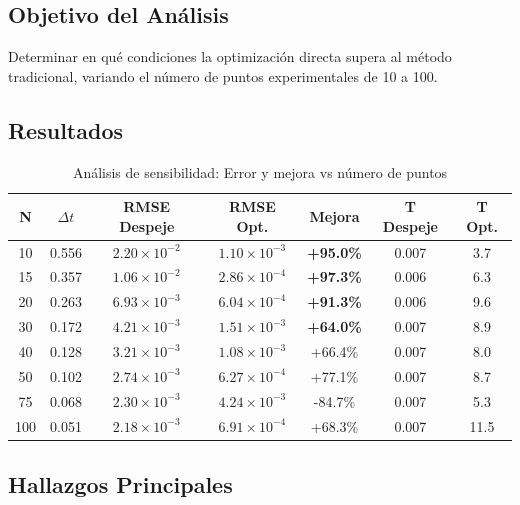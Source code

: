 \documentclass[11pt,a4paper]{article}
\begin{document}
\subsection{Objetivo del Análisis}

Determinar en qué condiciones la optimización directa supera al método tradicional, variando el número de puntos experimentales de 10 a 100.

\subsection{Resultados}

\begin{table}[H]
\centering
\caption{Análisis de sensibilidad: Error y mejora vs número de puntos}
\label{tab:sensitivity}
\small
\begin{tabular}{@{}ccccccc@{}}
\toprule
\textbf{N} & \textbf{$\Delta t$} & \textbf{RMSE Despeje} & \textbf{RMSE Opt.} & \textbf{Mejora} & \textbf{T Despeje} & \textbf{T Opt.} \\
\midrule
\rowcolor{green!20}
10  & 0.556 & $2.20 \times 10^{-2}$ & $1.10 \times 10^{-3}$ & \textbf{+95.0\%} & 0.007 & 3.7 \\
\rowcolor{green!20}
15  & 0.357 & $1.06 \times 10^{-2}$ & $2.86 \times 10^{-4}$ & \textbf{+97.3\%} & 0.006 & 6.3 \\
\rowcolor{green!15}
20  & 0.263 & $6.93 \times 10^{-3}$ & $6.04 \times 10^{-4}$ & \textbf{+91.3\%} & 0.006 & 9.6 \\
\rowcolor{green!10}
30  & 0.172 & $4.21 \times 10^{-3}$ & $1.51 \times 10^{-3}$ & \textbf{+64.0\%} & 0.007 & 8.9 \\
40  & 0.128 & $3.21 \times 10^{-3}$ & $1.08 \times 10^{-3}$ & +66.4\% & 0.007 & 8.0 \\
50  & 0.102 & $2.74 \times 10^{-3}$ & $6.27 \times 10^{-4}$ & +77.1\% & 0.007 & 8.7 \\
\rowcolor{red!10}
75  & 0.068 & $2.30 \times 10^{-3}$ & $4.24 \times 10^{-3}$ & -84.7\% & 0.007 & 5.3 \\
100 & 0.051 & $2.18 \times 10^{-3}$ & $6.91 \times 10^{-4}$ & +68.3\% & 0.007 & 11.5 \\
\bottomrule
\end{tabular}
\end{table}

\subsection{Hallazgos Principales}
\end{document}
